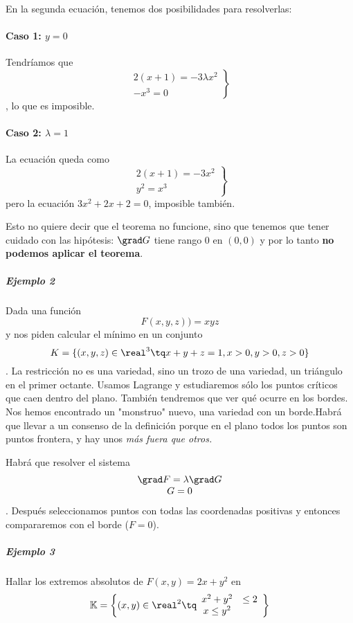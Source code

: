 En la segunda ecuación, tenemos dos posibilidades para resolverlas:

\paragraph{Caso 1: $y=0$}

Tendríamos que \[\left.\begin{matrix}2(x+1)=-3\lambda x^2 \\ -x^3 = 0\end{matrix}\right\rbrace \], lo que es imposible.

\paragraph{Caso 2: $\lambda = 1$}

La ecuación queda como \[\left.\begin{matrix}2(x+1)=-3x^2 \\ y^2=x^3 \end{matrix}\right\rbrace \] pero  la ecuación $3x^2+2x+2=0$, imposible también.

Esto no quiere decir que el teorema no funcione, sino que tenemos que tener cuidado con las hipótesis: $\grad G$ tiene rango 0 en $(0,0)$  y por lo tanto \textbf{no podemos aplicar el teorema}.
\subparagraph{Ejemplo 2}
Dada una función \[ F(x,y,z))=xyz \] y nos piden calcular el mínimo en un conjunto \[ K=\{(x,y,z)\in\real^3\tq x+y+z=1,x>0,y>0,z>0\} \]. La restricción no es una variedad, sino un trozo de una variedad, un triángulo en el primer octante. Usamos Lagrange y estudiaremos sólo los puntos críticos que caen dentro del plano. También tendremos que ver qué ocurre en los bordes. Nos hemos encontrado un "monstruo" nuevo, una variedad con un borde.Habrá que llevar a un consenso de la definición porque en el plano todos los puntos son puntos frontera, y hay unos \textit{más fuera que otros.} 

Habrá que resolver el sistema \[ \begin{matrix}\grad F=\lambda\grad G \\G=0\end{matrix} \]. Después seleccionamos puntos con todas las coordenadas positivas y entonces compararemos con el borde ($F=0$).

 
 \subparagraph{Ejemplo 3}
 Hallar los extremos absolutos de $F(x,y) = 2x+y^2$ en 
 \[\mathbb{K} = \left\{(x,y)\in\real^2 \tq \begin{array}{cc} x^2+y^2 &\leq 2\\ x\leq y^2\end{array}\right\}\]
 
